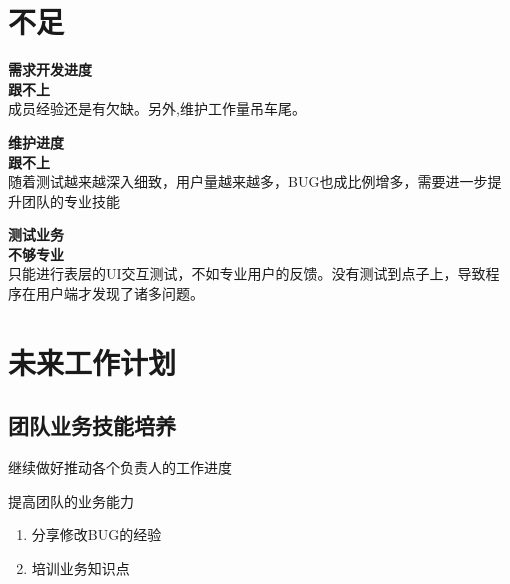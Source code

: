 \documentclass[AutoFakeBold,AutoFakeSlant]{beamer}
\begin{document}
	\section{不足}
	\begin{frame}[fragile]
		\large
		
		\begin{minipage}[l]{0.3\linewidth}
			\footnotesize 
			\linespread{1.5} \selectfont
			\textbf{\large 需求开发进度\\跟不上}\\
			成员经验还是有欠缺。另外,维护工作量吊车尾。
		\end{minipage}\hfill
		\begin{minipage}[l]{0.3\linewidth}
			\footnotesize 
			\linespread{1.5} \selectfont
			\textbf{\large 维护进度\\跟不上}\\
			随着测试越来越深入细致，用户量越来越多，BUG也成比例增多，需要进一步提升团队的专业技能
		\end{minipage}\hfill
		\begin{minipage}[l]{0.3\linewidth}
			\footnotesize 
			\linespread{1.5} \selectfont
			\textbf{\large 测试业务\\不够专业}\\
			只能进行表层的UI交互测试，不如专业用户的反馈。没有测试到点子上，导致程序在用户端才发现了诸多问题。
		\end{minipage}
	\end{frame}
	
	\section{未来工作计划}
	\subsection{团队业务技能培养}
	\begin{frame}[fragile]
		\large
		\linespread{2.8} \selectfont
		\begin{enumerate}
			\item 继续做好推动各个负责人的工作进度
			{
				\item
				提高团队的业务能力
				\begin{enumerate}
					\item 分享修改BUG的经验
					\item 培训业务知识点
				\end{enumerate}
			} 
		\end{enumerate}
	\end{frame}
	
\end{document}
